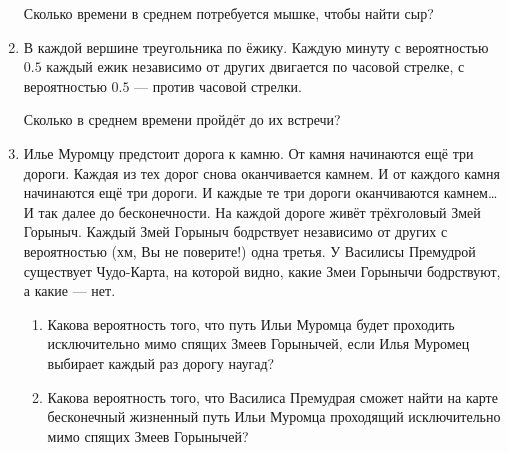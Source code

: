 \documentclass[12pt]{article}
\begin{document}
\begin{enumerate}
    
    Сколько времени в среднем потребуется мышке, чтобы найти сыр?
    
    \item В каждой вершине треугольника по ёжику. Каждую минуту с вероятностью $0.5$ каждый ежик
    независимо от других двигается по часовой стрелке, с вероятностью
    $0.5$ — против часовой стрелки.
    
    Сколько в среднем времени пройдёт до их встречи?
    

    \item Илье Муромцу предстоит дорога к камню. От камня начинаются ещё три дороги.
    Каждая из тех дорог снова оканчивается камнем. И от каждого камня начинаются ещё три дороги.
    И каждые те три дороги оканчиваются камнем\ldots И так далее до бесконечности.
    На каждой дороге живёт трёхголовый Змей Горыныч.
    Каждый Змей Горыныч бодрствует независимо от других с вероятностью (хм, Вы не поверите!) одна третья.
    У Василисы Премудрой существует Чудо-Карта, на которой видно,
    какие Змеи Горынычи бодрствуют, а какие — нет.
    
    \begin{enumerate}
        \item Какова вероятность того, что путь Ильи Муромца будет проходить 
        исключительно мимо спящих Змеев Горынычей, если 
        Илья Муромец выбирает каждый раз дорогу наугад?
        \item Какова вероятность того,
        что Василиса Премудрая сможет найти на карте
        бесконечный жизненный путь Ильи Муромца проходящий исключительно мимо спящих Змеев Горынычей?
    \end{enumerate}
\end{enumerate}

\newpage
\end{document}
